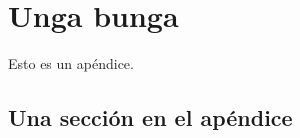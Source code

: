 \chapter{Unga bunga}

\noindent Esto es un apéndice.

\section{Una sección en el apéndice}

\noindent \lipsum